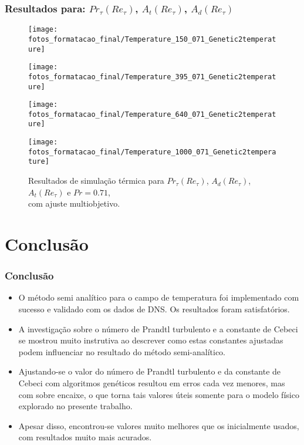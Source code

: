 \documentclass[xcolor=dvipsnames,10pt,aspectratio=169]{beamer}
\begin{document}
	
    \begin{frame}
		\frametitle{Resultados para: $Pr_\tau(Re_\tau)$, $A_t(Re_\tau)$, $A_d(Re_\tau)$}
    \begin{figure}[!h]
        \centering
        \begin{minipage}[t]{0.5\textwidth}
          \centering
          \texttt{[image: fotos\_formatacao\_final/Temperature\_150\_071\_Genetic2temperature]}
          \caption{$Re_\tau = 150$, $L2_t = 0.091$}
        \end{minipage}
        \begin{minipage}[t]{0.45\textwidth}
          \centering
          \texttt{[image: fotos\_formatacao\_final/Temperature\_395\_071\_Genetic2temperature]}
          \caption{$Re_\tau = 395$, $L2_t = 0.049$}
        \end{minipage}
        \begin{minipage}[t]{0.5\textwidth}
          \centering
          \texttt{[image: fotos\_formatacao\_final/Temperature\_640\_071\_Genetic2temperature]}
          \caption{$Re_\tau = 640$, $L2_t = 0.061$}
        \end{minipage}
        \begin{minipage}[t]{0.45\textwidth}
          \centering
          \texttt{[image: fotos\_formatacao\_final/Temperature\_1000\_071\_Genetic2temperature]}
          \caption{$Re_\tau = 1020$, $L2_t = 0.076$}
        \end{minipage}	
        \caption{Resultados de simulação térmica para $Pr_\tau(Re_\tau)$, $A_d(Re_\tau)$, $A_t(Re_\tau) $ e $Pr =0.71$,\\ com ajuste multiobjetivo.}
      \end{figure}
		\end{frame}	
	
	\section{Conclusão}

  \begin{frame}
    \frametitle{Conclusão}
    \begin{itemize}
      \item O método semi analítico para o campo de temperatura foi implementado com sucesso e validado com os dados de DNS. Os resultados foram satisfatórios.
      \item A investigação sobre o número de Prandtl turbulento e a constante de Cebeci se mostrou muito instrutiva ao descrever como estas constantes ajustadas podem influenciar no resultado do método semi-analítico.
      \item Ajustando-se o valor do número de Prandtl turbulento e da constante de Cebeci com algoritmos genéticos resultou em erros cada vez menores, mas com sobre encaixe, o que torna tais valores úteis somente para o modelo físico explorado no presente trabalho.
      \item Apesar disso, encontrou-se valores muito melhores que os inicialmente usados, com resultados muito mais acurados.
    \end{itemize}
  \end{frame}
	
\end{document}
